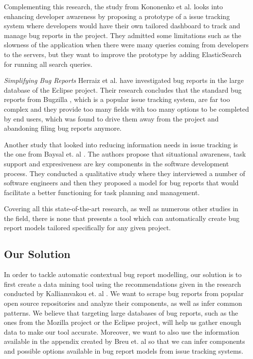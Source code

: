 \documentclass[11pt,english,twocolumn]{article}
\begin{document}
Complementing this research, the study from Kononenko et al. \cite{kononenko2014dashboards} 
looks into enhancing developer awareness by proposing a prototype of a issue tracking system
where developers would have their own tailored dashboard to track and manage bug reports in
the project. They admitted some limitations such as the slowness of the application when there
were many queries coming from developers to the servers, but they want to improve the prototype
by adding ElasticSearch \cite{elasticsearch} for running all search queries.

\emph{Simplifying Bug Reports} Herraiz et al. \cite{herraiz2008towards} have investigated
bug reports in the large database of the Eclipse project. Their research concludes that
the standard bug reports from Bugzilla \cite{bugzilla}, which is a popular issue tracking system,
are far too complex and they provide too many fields with too many options to be completed 
by end users, which was found to drive them away from the project and abandoning filing bug 
reports anymore. 

Another study that looked into reducing information needs in issue tracking is the one from
Baysal et. al \cite{baysal2014no}. The authors propose that situational awareness, task 
support and expresiveness are key components in the software development process. They 
conducted a qualitative study where they interviewed a number of software engineers and 
then they proposed a model for bug reports that would facilitate a better functioning for 
task planning and management. 

Covering all this state-of-the-art research, as well as numerous other studies in the field,
there is none that presents a tool which can automatically create bug report models
tailored specifically for any given project.

\subsection*{Our Solution}

In order to tackle automatic contextual bug report modelling, our solution is to first 
create a data mining tool using the recommendations given in the research conducted by 
Kalliamvakou et. al \cite{kalliamvakou2014promises}. We want to scrape bug reports from popular 
open source repositories and analyze their components, as well as infer common patterns. We believe that targeting 
large databases of bug reports, such as the ones from the Mozilla project or the Eclipse project,
will help us gather enough data to make our tool accurate. Moreover, we want to also use the
information available in the appendix created by Breu et. al \cite{breu2009appendix} 
so that we can infer components and possible options available in bug report models from
issue tracking systems.
\end{document}
